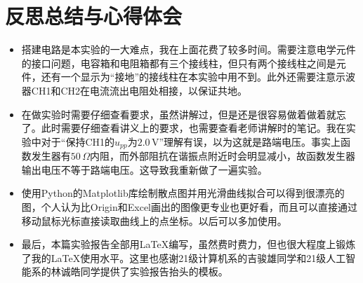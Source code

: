 \documentclass[12pt]{article}
\begin{document}
\section{反思总结与心得体会}
\begin{itemize}
    \item 搭建电路是本实验的一大难点，我在上面花费了较多时间。需要注意电学元件的接口问题，电容箱和电阻箱都有三个接线柱，但只有两个接线柱之间是元件，还有一个显示为“接地”的接线柱在本实验中用不到。此外还需要注意示波器CH1和CH2在电流流出电阻处相接，以保证共地。
    \item 在做实验时需要仔细查看要求，虽然讲解过，但是还是很容易做着做着就忘了。此时需要仔细查看讲义上的要求，也需要查看老师讲解时的笔记。我在实验中对于“保持CH1的$u_{pp}$为$2.0\,\mathrm{V}$”理解有误，以为这就是路端电压。事实上函数发生器有$50\,\Omega$内阻，而外部阻抗在谐振点附近时会明显减小，故函数发生器输出电压不等于路端电压。这导致我重新做了一遍实验。
    \item 使用Python的Matplotlib库绘制散点图并用光滑曲线拟合可以得到很漂亮的图，个人认为比Origin和Excel画出的图像更专业也更好看，而且可以直接通过移动鼠标光标直接读取曲线上的点坐标。以后可以多加使用。
    \item 最后，本篇实验报告全部用\LaTeX{}编写，虽然费时费力，但也很大程度上锻炼了我的\LaTeX{}使用水平。这里也感谢21级计算机系的吉骏雄同学和21级人工智能系的林诚皓同学提供了实验报告抬头的模板。
\end{itemize}
\end{document}
